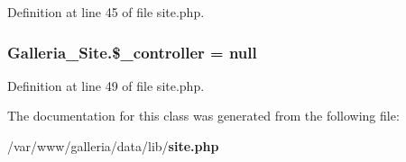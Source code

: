Definition at line 45 of file site.php.
\subsubsection{\setlength{\rightskip}{0pt plus 5cm}Galleria\_\-Site.\$\_\-controller = null\hspace{0.3cm}{\tt  [static, protected]}}\label{classGalleria__Site_fd6975b34472f56f8ca121cc907dfd99}




Definition at line 49 of file site.php.

The documentation for this class was generated from the following file:\begin{CompactItemize}
\item 
/var/www/galleria/data/lib/{\bf site.php}\end{CompactItemize}
